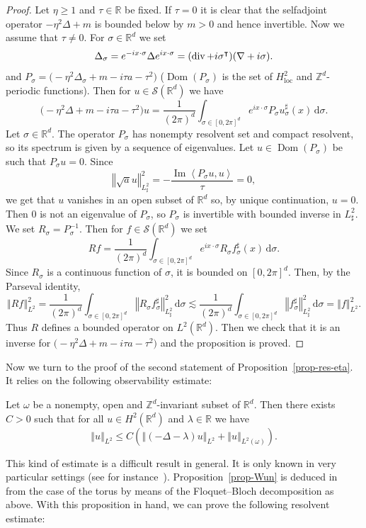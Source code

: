 \documentclass[AHL,Unicode,longabstracts]{cedram}
\newcommand{\nr}[1]{\left\Vert #1\right\Vert}
\newcommand{\innp}[2]{\left< #1, #2 \right>}
\renewcommand{\leq}{\leqslant}
\renewcommand{\geq}{\geqslant}
\newcommand{\inv}{^{-1}}
\newcommand{\1}{\mathds 1}
\newcommand{\trsp}{^{\intercal}}
\newcommand{\divg}{\mathop{\rm{div}}\nolimits}
\DeclareMathOperator{\Imop}{Im}
\DeclareMathOperator{\Dom}{Dom}
\renewcommand{\Im}{\Imop}
\newcommand{\loc}{{\mathrm{loc}}}
\newcommand{\R}{\mathbb{R}}
\newcommand{\D}{\Delta}
\renewcommand{\l}{\lambda}
\newcommand{\s}{\sigma}
\renewcommand{\t}{\tau}
\renewcommand{\o}{\omega}
\newcommand{\Sc}{{\mathcal S}}
\newcommand{\dd}{\mathrm{d}}
\newcommand{\dsigma}{\dd \sigma}
\begin{document}
\begin{proof}
Let $\eta \geq 1$ and $\t \in \R$ be fixed. If $\t = 0$ it is clear that the selfadjoint operator $-\eta^2 \D + m$ is bounded below by $m > 0$ and hence invertible. Now we assume that $\t \neq 0$. For $\s \in \R^d$ we set
\[
\D_\s = e^{-ix\cdot \s} \D e^{ix\cdot \s} = (\divg + i \s\trsp) (\nabla + i\s).
\]
and $P_\s = \big(-\eta^2 \D_\s + m - i\t a - \t^2 \big)$ ($\Dom(P_\s)$ is the set of $H^2_\loc$ and $\mathbb Z^d$-periodic functions). Then for $u \in \Sc(\R^d)$ we have
\[
\big(-\eta^2 \D + m - i\t a - \t^2 \big) u = \frac 1 {(2\pi)^d} \int_{\s \in [0,2\pi]^d} e^{ix\cdot \s} P_\s u^\sharp_\s(x) \, \dsigma.
\]
Let $\s \in \R^d$. The operator $P_\s$ has nonempty resolvent set and compact resolvent, so its spectrum is given by a sequence of eigenvalues. Let $u \in \Dom(P_\s)$ be such that $P_\s u = 0$. Since
\[
\nr{\sqrt a u}_{L^2_\sharp}^2 = - \frac {\Im \innp{P_\s u}{u}} \t = 0,
\]
we get that $u$ vanishes in an open subset of $\R^d$ so, by unique continuation, $u = 0$. Then 0 is not an eigenvalue of $P_\s$, so $P_\s$ is invertible with bounded inverse in $L^2_\sharp$. We set $R_\s = P_\s\inv$. Then for $f \in \Sc(\R^d)$ we set
\[
R f = \frac 1 {(2\pi)^d} \int_{\s \in [0,2\pi]^d} e^{ix\cdot \s} R_\s f^\sharp_\s(x) \, \dsigma.
\]
Since $R_\s$ is a continuous function of $\s$, it is bounded on $[0,2\pi]^d$. Then, by the Parseval identity,
\[
\nr{Rf}_{L^2}^2 = \frac 1 {(2\pi)^d} \int_{\s \in [0,2\pi]^d} \nr{R_\s f_\s^\sharp}_{L^2_\sharp}^2 \, \dsigma \lesssim \frac 1 {(2\pi)^d} \int_{\s \in [0,2\pi]^d} \nr{ f_\s^\sharp}_{L^2_\sharp}^2 \, \dsigma = \nr{f}_{L^2}^2.
\]
Thus $R$ defines a bounded operator on $L^2(\R^d)$. Then we check that it is an inverse for $\big(-\eta^2 \D + m - i\t a - \t^2 \big)$ and the proposition is proved.
\end{proof}

Now we turn to the proof of the second statement of Proposition~\ref{prop-res-eta}. It relies on the following observability estimate:

\begin{prop}\label{prop-Wun}
Let $\o$ be a nonempty, open and $\mathbb Z^d$-invariant subset of $\R^d$. Then there exists $C > 0$ such that for all $u \in H^2(\R^d)$ and $\l \in \R$ we have
\[
\nr{u}_{L^2} \leq C \left(\nr{(-\D - \l)u}_{L^2} + \nr{u}_{L^2(\o)} \right).
\]
\end{prop}

This kind of estimate is a difficult result in general. It is only known in very particular settings (see for instance~\cite{Jaffard90,BurqZwo12,AnantharamanLeMa16}). Proposition~\ref{prop-Wun} is deduced in~\cite{Wunsch} from the case of the torus by means of the Floquet--Bloch decomposition as above. With this proposition in hand, we can prove the following resolvent estimate:
\end{document}
